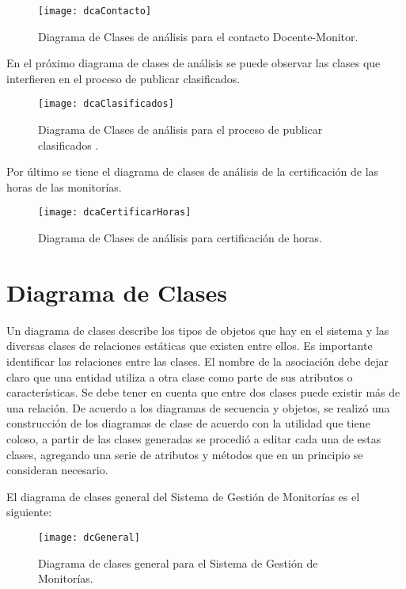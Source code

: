 \begin{figure}[H]
	\centering
	\texttt{[image: dcaContacto]}
	\centering
	\caption{Diagrama de Clases de análisis para el contacto Docente-Monitor.}
	\label{fig:dcaContacto}
\end{figure}

En el próximo diagrama de clases de análisis se puede observar las clases que interfieren en el proceso de publicar clasificados.

\begin{figure}[H]
	\centering
	\texttt{[image: dcaClasificados]}
	\centering
	\caption{Diagrama de Clases de análisis para el proceso de publicar clasificados .}
	\label{fig:dcaClasificado}
\end{figure}

Por último se tiene el diagrama de clases de análisis de la certificación de las horas de las monitorías.

\begin{figure}[H]
	\centering
	\texttt{[image: dcaCertificarHoras]}
	\centering
	\caption{Diagrama de Clases de análisis para certificación de horas.}
	\label{fig:dcaCertificarHoras}
\end{figure}

\newpage

\section{Diagrama de Clases}

Un diagrama de clases describe los tipos de objetos que hay en el sistema y las diversas clases de relaciones estáticas que existen entre ellos.
Es importante identificar las relaciones entre las clases. El nombre de la asociación debe dejar claro que una entidad utiliza a otra clase como parte de sus atributos o características. Se debe tener en cuenta que entre dos clases puede existir más de una relación.\cite{Sergio_2015}
\newline
De acuerdo a los diagramas de secuencia y objetos, se realizó una construcción de los diagramas de clase de acuerdo con la utilidad que tiene coloso, a partir de las clases generadas se procedió a editar cada una de estas clases, agregando una serie de atributos y métodos que en un principio se consideran necesario.

El diagrama de clases general del Sistema de Gestión de Monitorías es el siguiente:

\begin{figure}[H]
	\centering
	\texttt{[image: dcGeneral]}
	\centering
	\caption{Diagrama de clases general para el Sistema de Gestión de Monitorías.}
	\label{fig:dcGeneral}
\end{figure}


